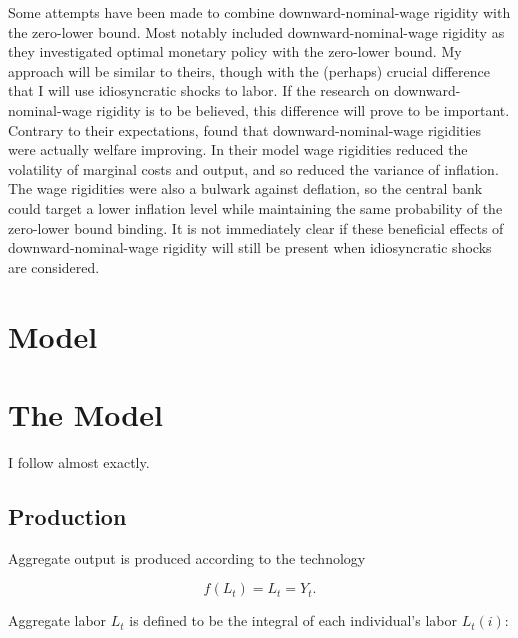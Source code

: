 \documentclass[12pt,a4paper]{scrartcl}            %
\begin{document}
Some attempts have been made to combine downward-nominal-wage rigidity with the zero-lower bound.
Most notably \cite{coibon_gorodnichenko_wieland_2012} included downward-nominal-wage rigidity as they investigated optimal monetary policy with the zero-lower bound.
My approach will be similar to theirs, though with the (perhaps) crucial difference that I will use idiosyncratic shocks to labor.
If the research on downward-nominal-wage rigidity is to be believed, this difference will prove to be important.
Contrary to their expectations, \cite{coibon_gorodnichenko_wieland_2012} found that downward-nominal-wage rigidities were actually welfare improving.
In their model wage rigidities reduced the volatility of marginal costs and output, and so reduced the variance of inflation.
The wage rigidities were also a bulwark against deflation, so the central bank could target a lower inflation level while maintaining the same probability of the zero-lower bound binding.
It is not immediately clear if these beneficial effects of downward-nominal-wage rigidity will still be present when idiosyncratic shocks are considered.

\section{Model}

\section{The Model}
\label{sec:the_model}

I follow \cite{daly_hobijn_2013} almost exactly.

\subsection{Production} %
\label{sub:production}


Aggregate output is produced according to the technology

\begin{equation} \label{eq:agg_output}
    f(L_t) = L_t = Y_t.
\end{equation}

Aggregate labor \(L_t\) is defined to be the integral of each individual's labor \(L_t(i)\):
\end{document}
